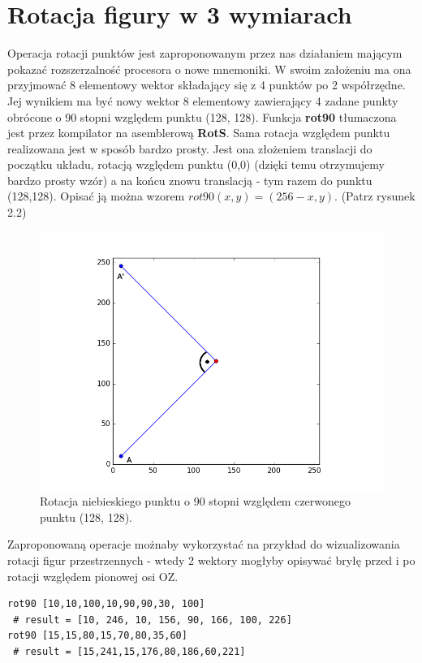 \section{Rotacja figury w 3 wymiarach}
Operacja rotacji punktów jest zaproponowanym przez nas działaniem mającym pokazać rozszerzalność procesora o nowe mnemoniki. W swoim założeniu ma ona przyjmować 8 elementowy wektor składający się z 4 punktów po 2 współrzędne. Jej wynikiem ma być nowy wektor 8 elementowy zawierający 4 zadane punkty obrócone o 90 stopni względem punktu (128, 128). Funkcja \textbf{rot90} tłumaczona jest przez kompilator na asemblerową \textbf{RotS}. Sama rotacja względem punktu realizowana jest w sposób bardzo prosty. Jest ona złożeniem translacji do początku układu, rotacją względem punktu (0,0) (dzięki temu otrzymujemy bardzo prosty wzór) a na końcu znowu translacją - tym razem do punktu (128,128). Opisać ją można wzorem $rot90(x,y) = (256 - x, y) $. (Patrz rysunek 2.2)
\begin{figure}[!ht]
\centerline{
\includegraphics[scale=1]{images/figure_1}}
\caption{Rotacja niebieskiego punktu o 90 stopni względem czerwonego punktu (128, 128).}
\end{figure}
\clearpage
Zaproponowaną operacje możnaby wykorzystać na przykład do wizualizowania rotacji figur przestrzennych - wtedy 2 wektory mogłyby opisywać bryłę przed i po rotacji względem pionowej osi OZ.
\begin{lstlisting}[frame=single]
rot90 [10,10,100,10,90,90,30, 100]
 # result = [10, 246, 10, 156, 90, 166, 100, 226] 
rot90 [15,15,80,15,70,80,35,60]
 # result = [15,241,15,176,80,186,60,221] 
\end{lstlisting}
